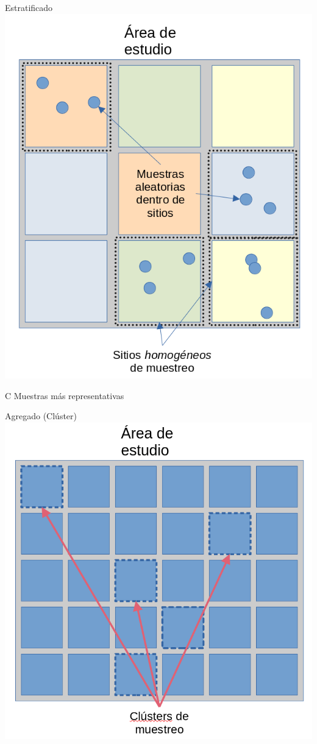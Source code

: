 \documentclass[
  11pt,
  ignorenonframetext,
]{beamer}
\begin{document}
\begin{frame}{Estratificado}
\protect\hypertarget{estratificado}{}
\includegraphics{Figuras-tecnicas/Estratificado.png}
\end{frame}

\begin{frame}{C}
\protect\hypertarget{c}{}
Muestras más representativas
\end{frame}

\begin{frame}{Agregado (Clúster)}
\protect\hypertarget{agregado-cluxfaster}{}
\includegraphics{Figuras-tecnicas/Cluster.png}
\end{frame}
\end{document}
